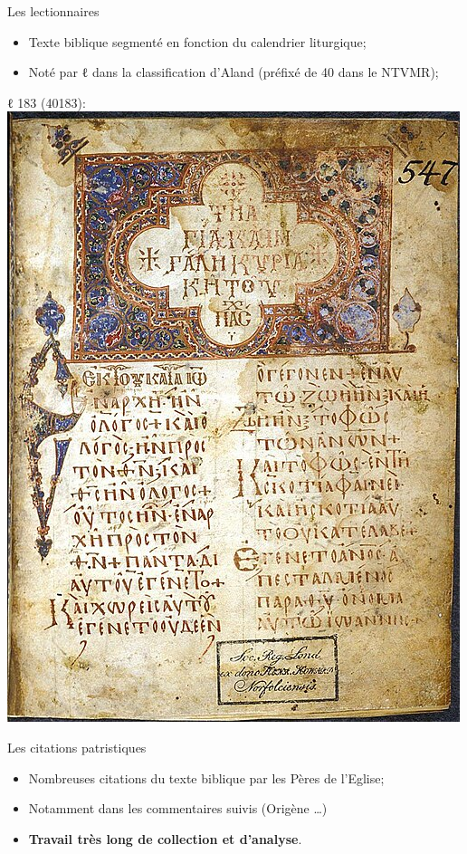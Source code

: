 \documentclass[11pt]{beamer}
\begin{document}
\begin{frame}{Les lectionnaires}
\begin{minipage}{.5\textwidth}
    \begin{itemize}
        \item Texte biblique segmenté en fonction du calendrier liturgique;
        \item Noté par ℓ dans la classification d'Aland (préfixé de 40 dans le NTVMR);
    \end{itemize}
\end{minipage}%
\hfill
\begin{minipage}{.4\textwidth}
ℓ 183 (40183):\\

    \includegraphics[scale=.2]{img/Lectionary_183_folio_2.JPG}
\end{minipage}

\end{frame}

\begin{frame}{Les citations patristiques}
\begin{itemize}
    \item Nombreuses citations du texte biblique par les Pères de l'Eglise;
    \item Notamment dans les commentaires suivis (Origène \dots)
    \item \textbf{Travail très long de collection et d'analyse}.
\end{itemize}
    
\end{frame}
\end{document}
